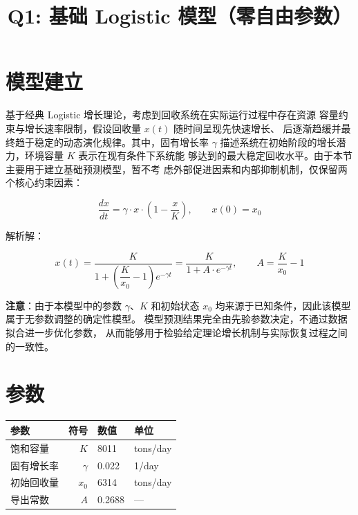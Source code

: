 \documentclass[12pt,a4paper]{article}
\title{Q1: 基础 Logistic 模型（零自由参数）}
\author{}
\date{}
\begin{document}
\maketitle

\section{模型建立}

基于经典 Logistic 增长理论，考虑到回收系统在实际运行过程中存在资源
容量约束与增长速率限制，假设回收量 $x(t)$ 随时间呈现先快速增长、
后逐渐趋缓并最终趋于稳定的动态演化规律。其中，固有增长率 $\gamma$
 描述系统在初始阶段的增长潜力，环境容量 $K$ 表示在现有条件下系统能
 够达到的最大稳定回收水平。由于本节主要用于建立基础预测模型，暂不考
 虑外部促进因素和内部抑制机制，仅保留两个核心约束因素：

\begin{equation}\label{eq:ode}
\frac{dx}{dt} = \gamma \cdot x \cdot \left(1 - \frac{x}{K}\right), \qquad x(0) = x_0
\end{equation}

解析解：

\begin{equation}\label{eq:solution}
x(t) = \frac{K}{1 + \left(\dfrac{K}{x_0} - 1\right) e^{-\gamma t}}
     = \frac{K}{1 + A \cdot e^{-\gamma t}}, \qquad A = \frac{K}{x_0} - 1
\end{equation}

\textbf{注意}：由于本模型中的参数 $\gamma$、$K$ 和初始状态 
$x_0$ 均来源于已知条件，因此该模型属于无参数调整的确定性模型。
模型预测结果完全由先验参数决定，不通过数据拟合进一步优化参数，
从而能够用于检验给定理论增长机制与实际恢复过程之间的一致性。
\section{参数}

\begin{center}
\begin{tabular}{lrll}
\toprule
参数 & 符号 & 数值 & 单位 \\
\midrule
饱和容量      & $K$      & 8011   & tons/day \\
固有增长率    & $\gamma$ & 0.022  & 1/day \\
初始回收量    & $x_0$    & 6314   & tons/day \\
导出常数      & $A$      & 0.2688 & --- \\
\bottomrule
\end{tabular}
\end{center}
\end{document}
